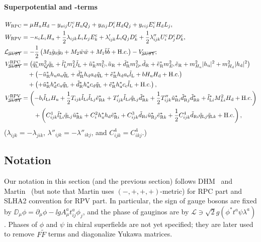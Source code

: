 \documentclass[CheatSheet]{subfiles}
\begin{document}
\paragraph{Superpotential and -terms}
\begin{align}
 W\w{RPC} &= \mu\Hu\Hd
           - \yu[ij] U^\cc_i\Hu Q_j
           + \yd[ij] D^\cc_i\Hd Q_j
           + \ye[ij] E^\cc_i\Hd L_j,\\
 W\w{RPV} &= -\kappa_i L_i\Hu
           + \frac12 \lambda  _{ijk} L_i L_j E^\cc_k
           +         \lambda' _{ijk} L_i Q_j D^\cc_k
           + \frac12 \lambda''_{ijk} U^\cc_i D^\cc_j D^\cc_k,
\\
\mathcal L_{\text{\cancel{SUSY}}}&=
- \frac12\left(M_3\tig_0\tig_0+M_2\tiw\tiw+M_1\tib\tib+\text{H.c.}\right)
-V_{\text{\cancel{SUSY}}};\\
V^{\mathrm{RPC}}_{\text{\cancel{SUSY}}}&=
\left(\tqL^*m_Q^2\tqL+\tlL^*m_L^2\tlL+\tuR^* m_{U^\cc}^2\tuR + \tdR^* m_{D^\cc}^2\tdR + \teR^* m_{E^\cc}^2\teR
       +m^2_{\Hu}|\hu|^2 + m^2_{\Hd}|\hd|^2\right)
\notag\\&\quad
       +\left(-\tuR^*\hu {a\w u}\tqL + \tdR^* \hd {a\w d} \tqL+ \teR^* \hd {a\w e} \tlL + b\Hu\Hd+\text{H.c.}\right)
\notag\\&\quad
       +\left(+\tuR^*\hd^*{c\w u}\tqL+\tdR^* \hu^*{c\w d}\tqL+\teR^*\hu^*{c\w e}\tlL+\text{H.c.}\right),
\\
V^{\mathrm{RPV}}_{\text{\cancel{SUSY}}}&=
    \left(-b_i\tlL[i]\Hu +\frac12T_{ijk}\tlL[i]\tlL[j]\teR[k]^*+T'_{ijk}\tlL[i]\tqL[j]\tdR[k]^*
             +\frac12T''_{ijk}\tuR[i]^*\tdR[j]^*\tdR[k]^*
    +\tlL[i]^*M^2_{Li}\Hd+\text{H.c.}\right)
\notag\\&\qquad
   + \left(C^1_{ijk}\tlL[i]^*\tqL[j]\tuR[k]^* + C^2_i\hu^*\hd\teR[i]^* + C^3_{ijk}\tdR[i]\tuR[j]^*\teR[k]^*+\frac12C^4_{ijk}\tdR[i]\tqL[j]\tqL[k]+\text{H.c.}\right),
\end{align}
($\lambda_{ijk}=-\lambda_{jik}$, $\lambda''_{ijk}=-\lambda''_{ikj}$, and
$C^4_{ijk}=C^4_{ikj}$.)



\clearpage

\detailstyle



\subsection{Notation}
Our notation in this section (and the previous section)  follows DHM~\cite[PhysRept]{0812.1594} and Martin~\cite[v7]{hep-ph9709356} (but note that Martin uses $(-,+,+,+)$-metric) for RPC part and SLHA2 convention for RPV part.
In particular, the sign of gauge bosons are fixed by $\DD_\mu\phi = \partial_\mu\phi - \ii g A_\mu^a t^a_{ij}\phi_j$, and the phase of gauginos are by $\mathcal L\ni \sqrt2 g (\phi^*t^a\psi\lambda^a)$.
Phases of $\phi$ and $\psi$ in chiral superfields are not yet specified; they are later used to remove $F\tilde F$ terms and diagonalize Yukawa matrices.
\end{document}
